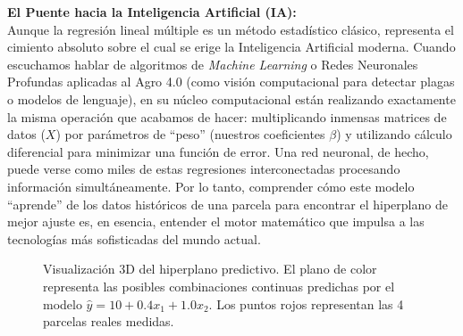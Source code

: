 \documentclass{article}
\begin{document}
\textbf{El Puente hacia la Inteligencia Artificial (IA):} \\
Aunque la regresión lineal múltiple es un método estadístico clásico, representa el cimiento absoluto sobre el cual se erige la Inteligencia Artificial moderna. Cuando escuchamos hablar de algoritmos de \textit{Machine Learning} o Redes Neuronales Profundas aplicadas al Agro 4.0 (como visión computacional para detectar plagas o modelos de lenguaje), en su núcleo computacional están realizando exactamente la misma operación que acabamos de hacer: multiplicando inmensas matrices de datos ($X$) por parámetros de ``peso'' (nuestros coeficientes $\beta$) y utilizando cálculo diferencial para minimizar una función de error. Una red neuronal, de hecho, puede verse como miles de estas regresiones interconectadas procesando información simultáneamente. Por lo tanto, comprender cómo este modelo ``aprende'' de los datos históricos de una parcela para encontrar el hiperplano de mejor ajuste es, en esencia, entender el motor matemático que impulsa a las tecnologías más sofisticadas del mundo actual.

\begin{figure}[h]
\centering
{}
\caption{Visualización 3D del hiperplano predictivo. El plano de color representa las posibles combinaciones continuas predichas por el modelo $\hat{y} = 10 + 0.4x_1 + 1.0x_2$. Los puntos rojos representan las 4 parcelas reales medidas.}
\label{fig:hiperplano}
\end{figure}
\end{document}

